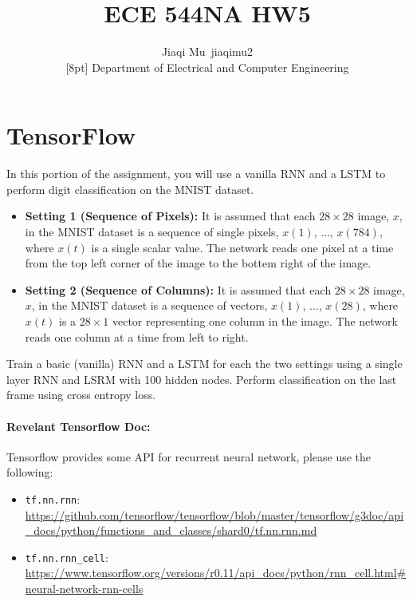 \documentclass[12pt]{article}
\newcommand{\1}{\mathbf{1}}
\begin{document}
{\raggedright


\title{ECE 544NA HW5}%
\author{Jiaqi Mu~jiaqimu2 \\
[8pt]%
Department of Electrical and Computer Engineering} %

\maketitle

\section{TensorFlow}
In this portion of the assignment, you will use a vanilla RNN and a LSTM to perform digit classification on the MNIST dataset.

\begin{itemize}
  \item {\bf Setting 1 (Sequence of Pixels):} It is assumed that each $28\times 28$ image, $x$, in the MNIST dataset is a sequence of single pixels, $x(1)$, ..., $x(784)$, where $x(t)$ is a single scalar value. The network reads one pixel at a time from the top left corner of the image to the bottem right of the image.
  \item {\bf Setting 2 (Sequence of Columns):} It is assumed that each $28\times 28$ image, $x$, in the MNIST dataset is a sequence of vectors, $x(1)$, ..., $x(28)$, where $x(t)$ is a $28\times 1$ vector representing one column in the image. The network reads one column at a time from left to right.
\end{itemize}

Train a basic (vanilla) RNN and a LSTM for each the two settings using a single layer RNN and LSRM with 100 hidden nodes. Perform classification on the last frame using cross entropy loss. 

\paragraph{Revelant Tensorflow Doc:} Tensorflow provides some API for recurrent neural network, please use the following:
\begin{itemize}
  \item {\tt tf.nn.rnn}: \url{https://github.com/tensorflow/tensorflow/blob/master/tensorflow/g3doc/api_docs/python/functions_and_classes/shard0/tf.nn.rnn.md}
  \item {\tt tf.nn.rnn\_cell}: \url{https://www.tensorflow.org/versions/r0.11/api_docs/python/rnn_cell.html#neural-network-rnn-cells}
\end{itemize}

}
\end{document}
